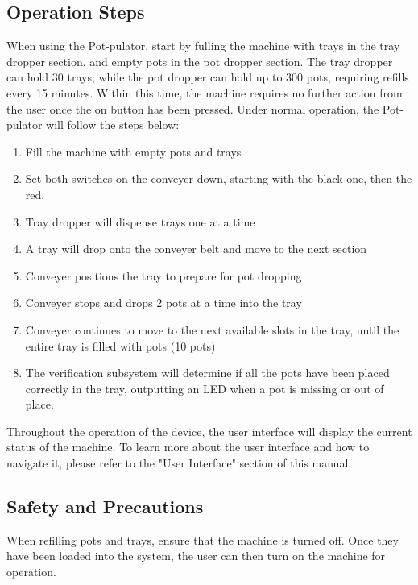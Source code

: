 \documentclass[12pt, titlepage]{article}
\begin{document}
\subsection{Operation Steps}
When using the Pot-pulator, start by fulling the machine with trays in the tray dropper section, and empty pots in the pot dropper section. The tray dropper can hold 30 trays, while the pot dropper can hold up to 300 pots, requiring refills every 15 minutes. Within this time, the machine requires no further action from the user once the on button has been pressed. Under normal operation, the Pot-pulator will follow the steps below:
\\ 
\begin{enumerate}
\item Fill the machine with empty pots and trays 
\item Set both switches on the conveyer down, starting with the black one, then the red.

\item Tray dropper will dispense trays one at a time

\item A tray will drop onto the conveyer belt and move to the next section

\item Conveyer positions the tray to prepare for pot dropping

\item Conveyer stops and drops 2 pots at a time into the tray

\item Conveyer continues to move to the next available slots in the tray, until the entire tray is filled with pots (10 pots)

\item The verification subsystem will determine if all the pots have been placed correctly in the tray, outputting an LED when a pot is missing or out of place. \\
\end{enumerate}

\noindent Throughout the operation of the device, the user interface will display the current status of the machine. To learn more about the user interface and how to navigate it, please refer to the "User Interface" section of this manual.
\subsection{Safety and Precautions}
When refilling pots and trays, ensure that the machine is turned off. Once they have been loaded into the system, the user can then turn on the machine for operation.
\end{document}
